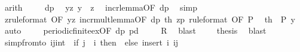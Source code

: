 \begin{isabellebody}
\ arith\isanewline
\ \ \ \isamarkupfalse%
\ dp\ \isamarkupfalse%
\ yz{\isacharcolon}{\kern0pt}\ {\isachardoublequoteopen}{\isacharquery}{\kern0pt}y\ {\isachargreater}{\kern0pt}\ z{\isachardoublequoteclose}\ \isamarkupfalse%
\ incr{\isacharunderscore}{\kern0pt}lemma{\isacharbrackleft}{\kern0pt}OF\ dp{\isacharbrackright}{\kern0pt}\ \isamarkupfalse%
\ simp\isanewline
\ \ \ \isamarkupfalse%
\ z{\isacharbrackleft}{\kern0pt}rule{\isacharunderscore}{\kern0pt}format{\isacharcomma}{\kern0pt}\ OF\ yz{\isacharbrackright}{\kern0pt}\ incr{\isacharunderscore}{\kern0pt}mult{\isacharunderscore}{\kern0pt}lemma{\isacharbrackleft}{\kern0pt}OF\ dp\ th\ zp{\isacharcomma}{\kern0pt}\ rule{\isacharunderscore}{\kern0pt}format{\isacharcomma}{\kern0pt}\ OF\ P{\isacharbrackright}{\kern0pt}\ \isamarkupfalse%
\ th{}{\isacharcolon}{\kern0pt}\ {\isachardoublequoteopen}\ P{\isacharprime}{\kern0pt}\ {\isacharquery}{\kern0pt}y{\isachardoublequoteclose}\ \isamarkupfalse%
\ auto\isanewline
\ \ \ \isamarkupfalse%
\ periodic{\isacharunderscore}{\kern0pt}finite{\isacharunderscore}{\kern0pt}ex{\isacharbrackleft}{\kern0pt}OF\ dp\ pd{\isacharbrackright}{\kern0pt}\isanewline
\ \ \ \isamarkupfalse%
\ {\isachardoublequoteopen}{\isacharquery}{\kern0pt}R{}{\isachardoublequoteclose}\ \isamarkupfalse%
\ blast\isacommand{{\isacharbraceright}{\kern0pt}}\isamarkupfalse%
\isanewline
\ \isamarkupfalse%
\ \isamarkupfalse%
\ {\isacharquery}{\kern0pt}thesis\ \isamarkupfalse%
\ blast\isanewline
{}\isamarkupfalse%
%
\endisatagproof
{\isafoldproof}%
%
\isadelimproof
\isanewline
%
\endisadelimproof
\isanewline
{}\isamarkupfalse%
\ simp{\isacharunderscore}{\kern0pt}from{\isacharunderscore}{\kern0pt}to{\isacharcolon}{\kern0pt}\ {\isachardoublequoteopen}{\isacharbraceleft}{\kern0pt}i{\isachardot}{\kern0pt}{\isachardot}{\kern0pt}j{\isacharcolon}{\kern0pt}{\isacharcolon}{\kern0pt}int{\isacharbraceright}{\kern0pt}\ {\isacharequal}{\kern0pt}\ {\isacharparenleft}{\kern0pt}if\ j\ {\isacharless}{\kern0pt}\ i\ then\ {\isacharbraceleft}{\kern0pt}{\isacharbraceright}{\kern0pt}\ else\ insert\ i\ {\isacharbraceleft}{\kern0pt}i{\isacharplus}{\kern0pt}{}{\isachardot}{\kern0pt}{\isachardot}{\kern0pt}j{\isacharbraceright}{\kern0pt}{\isacharparenright}{\kern0pt}{\isachardoublequoteclose}\isanewline
%
\isadelimproof
%
\endisadelimproof
%
\isatagproof
{}\isamarkupfalse%

\end{isabellebody}

